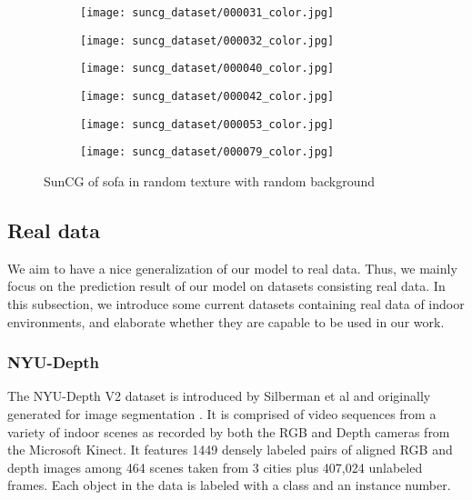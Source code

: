 \begin{figure}[h!]
\begin{subfigure}[b]{0.32\linewidth}
    \texttt{[image: suncg\_dataset/000031\_color.jpg]}
  \end{subfigure}
  \begin{subfigure}[b]{0.32\linewidth}
    \texttt{[image: suncg\_dataset/000032\_color.jpg]}
  \end{subfigure}
  \begin{subfigure}[b]{0.32\linewidth}
    \texttt{[image: suncg\_dataset/000040\_color.jpg]}
  \end{subfigure}
  \begin{subfigure}[b]{0.32\linewidth}
    \texttt{[image: suncg\_dataset/000042\_color.jpg]}
  \end{subfigure}
  \begin{subfigure}[b]{0.32\linewidth}
    \texttt{[image: suncg\_dataset/000053\_color.jpg]}
  \end{subfigure}
  \begin{subfigure}[b]{0.32\linewidth}
    \texttt{[image: suncg\_dataset/000079\_color.jpg]}
  \end{subfigure}
  \caption{SunCG of sofa in random texture with random background}
  \label{fig:suncg_dataset}
\end{figure}


\subsection{Real data}
We aim to have a nice generalization of our model to real data. Thus, we mainly focus on the prediction result of our model on datasets consisting real data. In this subsection, we introduce some current datasets containing real data of indoor environments, and elaborate whether they are capable to be used in our work.

\subsubsection{NYU-Depth}
The NYU-Depth V2 dataset is introduced by Silberman et al and originally generated for image segmentation \cite{Silberman:ECCV12}. It is comprised of video sequences from a variety of indoor scenes as recorded by both the RGB and Depth cameras from the Microsoft Kinect. It features 1449 densely labeled pairs of aligned RGB and depth images among 464 scenes taken from 3 cities plus 407,024 unlabeled frames. Each object in the data is labeled with a class and an instance number.

